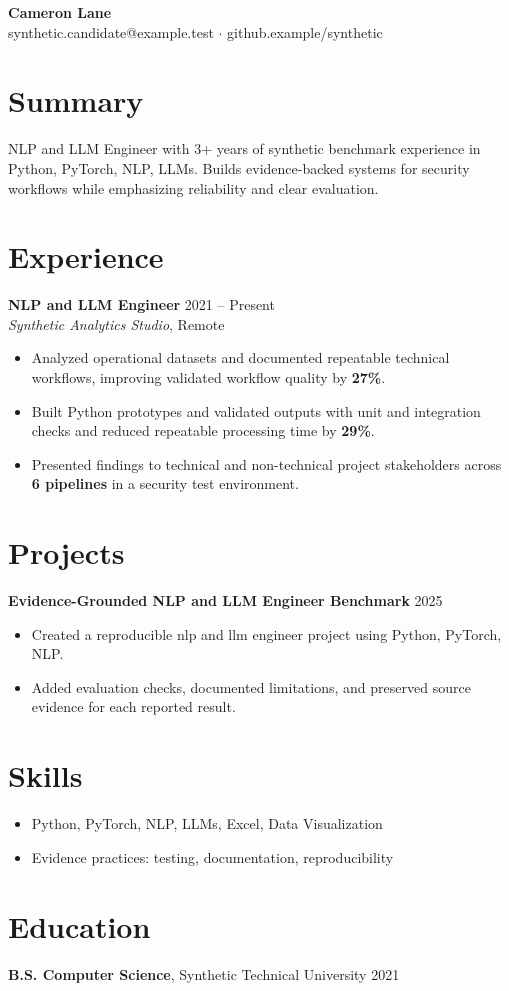 \documentclass[10pt,letterpaper]{article}
\newcommand{\resumeItem}[1]{\item #1}
\newcommand{\resumeItemListStart}{\begin{itemize}[leftmargin=*]}
\newcommand{\resumeItemListEnd}{\end{itemize}}
\begin{document}
\begin{center}
{\Large \textbf{Cameron Lane}}\\
synthetic.candidate@example.test $\cdot$ github.example/synthetic
\end{center}

\section*{Summary}
NLP and LLM Engineer with 3+ years of synthetic benchmark experience in Python, PyTorch, NLP, LLMs. Builds evidence-backed systems for security workflows while emphasizing reliability and clear evaluation.

\section*{Experience}
\textbf{NLP and LLM Engineer} \hfill 2021 -- Present\\
\textit{Synthetic Analytics Studio}, Remote
\resumeItemListStart
  \resumeItem{Analyzed operational datasets and documented repeatable technical workflows, improving validated workflow quality by \textbf{27\%}.}
  \resumeItem{Built Python prototypes and validated outputs with unit and integration checks and reduced repeatable processing time by \textbf{29\%}.}
  \resumeItem{Presented findings to technical and non-technical project stakeholders across \textbf{6 pipelines} in a security test environment.}
\resumeItemListEnd

\section*{Projects}
\textbf{Evidence-Grounded NLP and LLM Engineer Benchmark} \hfill 2025
\resumeItemListStart
  \resumeItem{Created a reproducible nlp and llm engineer project using Python, PyTorch, NLP.}
  \resumeItem{Added evaluation checks, documented limitations, and preserved source evidence for each reported result.}
\resumeItemListEnd

\section*{Skills}
\resumeItemListStart
  \resumeItem{Python, PyTorch, NLP, LLMs, Excel, Data Visualization}
  \resumeItem{Evidence practices: testing, documentation, reproducibility}
\resumeItemListEnd

\section*{Education}
\textbf{B.S. Computer Science}, Synthetic Technical University \hfill 2021
\end{document}
